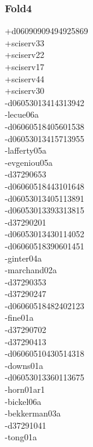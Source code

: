 \begin{multicols}{3}
\subsubsection*{Fold4}
+d06090909494925869\\
+sciserv33\\
+sciserv22\\
+sciserv17\\
+sciserv44\\
+sciserv30\\
-d06053013414313942\\
-lecue06a\\
-d06060518405601538\\
-d06053013415713955\\
-lafferty05a\\
-evgeniou05a\\
-d37290653\\
-d06060518443101648\\
-d06053013405113891\\
-d06053013393313815\\
-d37290201\\
-d06053013430114052\\
-d06060518390601451\\
-ginter04a\\
-marchand02a\\
-d37290353\\
-d37290247\\
-d06060518482402123\\
-fine01a\\
-d37290702\\
-d37290413\\
-d06060510430514318\\
-downs01a\\
-d06053013360113675\\
-horn01ar1\\
-bickel06a\\
-bekkerman03a\\
-d37291041\\
-tong01a\\

\end{multicols}
